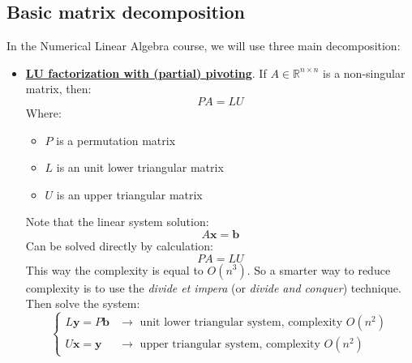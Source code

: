 \subsection{Basic matrix decomposition}

In the Numerical Linear Algebra course, we will use three main decomposition:
\begin{itemize}
	\item \underline{\textbf{LU factorization with (partial) pivoting}}. If $A \in \mathbb{R}^{n \times n}$ is a non-singular matrix, then:
	\begin{equation*}
		PA = LU
	\end{equation*}
	Where:
	\begin{itemize}
		\item $P$ is a permutation matrix
		\item $L$ is an unit lower triangular matrix
		\item $U$ is an upper triangular matrix
	\end{itemize}
	Note that the linear system solution:
	\begin{equation*}
		A\mathbf{x} = \mathbf{b}
	\end{equation*}
	Can be solved directly by calculation:
	\begin{equation*}
		PA = LU
	\end{equation*}
	This way the complexity is equal to $O\left(n^{3}\right)$. So a smarter way to reduce complexity is to use the \emph{divide et impera} (or \emph{divide and conquer}) technique. Then solve the system:
	\begin{equation*}
		\begin{cases}
			L\mathbf{y} = P\mathbf{b} & \rightarrow \text{ unit lower triangular system, complexity } O\left(n^{2}\right) \\
			U\mathbf{x} = \mathbf{y}  & \rightarrow \text{ upper triangular system, complexity } O\left(n^{2}\right)
		\end{cases}
	\end{equation*}


\end{itemize}
